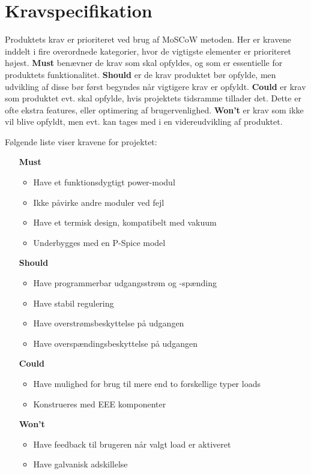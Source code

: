 \chapter{Kravspecifikation}

Produktets krav er prioriteret ved brug af MoSCoW metoden. Her er kravene inddelt i fire overordnede kategorier, hvor de vigtigste elementer er prioriteret højest. \textbf{Must} benævner de krav som skal opfyldes, og som er essentielle for produktets funktionalitet. \textbf{Should} er de krav produktet bør opfylde, men udvikling af disse bør først begyndes når vigtigere krav er opfyldt. \textbf{Could} er krav som produktet evt. skal opfylde, hvis projektets tidsramme tillader det. Dette er ofte ekstra features, eller optimering af brugervenlighed. \textbf{Won't} er krav som ikke vil blive opfyldt, men evt. kan tages med i en videreudvikling af produktet.

\noindent Følgende liste viser kravene for projektet:
\begin{itemize}
	\item[\textbf{Must}]
		\begin{itemize}
			\item Have et funktionsdygtigt power-modul
			\item Ikke påvirke andre moduler ved fejl
			\item Have et termisk design, kompatibelt med vakuum
			\item Underbygges med en P-Spice model

		\end{itemize}
	\item[\textbf{Should}]
		\begin{itemize}
			\item Have programmerbar udgangsstrøm og -spænding
			\item Have stabil regulering
			\item Have overstrømsbeskyttelse på udgangen
			\item Have overspændingsbeskyttelse på udgangen

		\end{itemize}
	\item[\textbf{Could}] 
		\begin{itemize}
			\item Have mulighed for brug til mere end to forskellige typer loads
			\item Konstrueres med EEE komponenter

		\end{itemize}
	\item[\textbf{Won't}]
		\begin{itemize}
			\item Have feedback til brugeren når valgt load er aktiveret
			\item Have galvanisk adskillelse
			
		\end{itemize}
\end{itemize}

